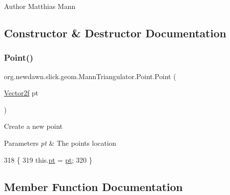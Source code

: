 \begin{DoxyAuthor}{Author}
Matthias Mann 
\end{DoxyAuthor}


\subsection{Constructor \& Destructor Documentation}
\mbox{\label{classorg_1_1newdawn_1_1slick_1_1geom_1_1_mann_triangulator_1_1_point_aadb7397067180e5b2f28f1ffb777e081}} 
\subsubsection{\texorpdfstring{Point()}{Point()}}
{\footnotesize\ttfamily org.\+newdawn.\+slick.\+geom.\+Mann\+Triangulator.\+Point.\+Point (\begin{DoxyParamCaption}\item[{\mbox{\hyperlink{classorg_1_1newdawn_1_1slick_1_1geom_1_1_vector2f}{Vector2f}}}]{pt }\end{DoxyParamCaption})\hspace{0.3cm}{\ttfamily [inline]}}

Create a new point


\begin{DoxyParams}{Parameters}
{\em pt} & The points location \\
\hline
\end{DoxyParams}

\begin{DoxyCode}
318                                   \{
319             this.\mbox{\hyperlink{classorg_1_1newdawn_1_1slick_1_1geom_1_1_mann_triangulator_1_1_point_afd78802a3fe9d6abf60a218d24be56aa}{pt}} = \mbox{\hyperlink{classorg_1_1newdawn_1_1slick_1_1geom_1_1_mann_triangulator_1_1_point_afd78802a3fe9d6abf60a218d24be56aa}{pt}};
320         \}
\end{DoxyCode}


\subsection{Member Function Documentation}
\mbox{\label{classorg_1_1newdawn_1_1slick_1_1geom_1_1_mann_triangulator_1_1_point_a61201245a3be65aae48cc8a678e7d4ac}} 

